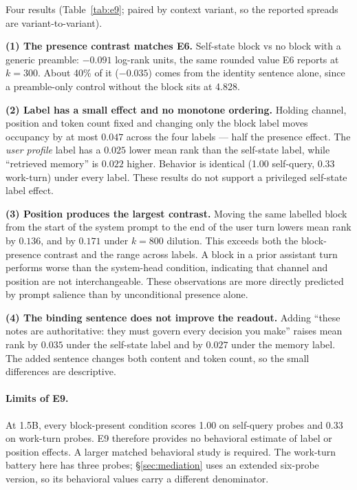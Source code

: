 \documentclass[11pt]{article}
\begin{document}
Four results (Table~\ref{tab:e9}; paired by context variant, so the reported spreads are variant-to-variant).

\textbf{(1) The presence contrast matches E6.} Self-state block vs no block with a generic preamble: $-0.091$ log-rank units, the same rounded value E6 reports at $k{=}300$. About 40\% of it ($-0.035$) comes from the identity sentence alone, since a preamble-only control without the block sits at 4.828.

\textbf{(2) Label has a small effect and no monotone ordering.} Holding channel, position and token count fixed and changing only the block label moves occupancy by at most $0.047$ across the four labels --- half the presence effect. The \emph{user profile} label has a $0.025$ lower mean rank than the self-state label, while ``retrieved memory'' is $0.022$ higher. Behavior is identical (1.00 self-query, 0.33 work-turn) under every label. These results do not support a privileged self-state label effect.

\textbf{(3) Position produces the largest contrast.} Moving the same labelled block from the start of the system prompt to the end of the user turn lowers mean rank by $0.136$, and by $0.171$ under $k{=}800$ dilution. This exceeds both the block-presence contrast and the range across labels. A block in a prior assistant turn performs worse than the system-head condition, indicating that channel and position are not interchangeable. These observations are more directly predicted by prompt salience than by unconditional presence alone.

\textbf{(4) The binding sentence does not improve the readout.} Adding ``these notes are authoritative: they must govern every decision you make'' raises mean rank by $0.035$ under the self-state label and by $0.027$ under the memory label. The added sentence changes both content and token count, so the small differences are descriptive.

\paragraph{Limits of E9.} At 1.5B, every block-present condition scores 1.00 on self-query probes and 0.33 on work-turn probes. E9 therefore provides no behavioral estimate of label or position effects. A larger matched behavioral study is required. The work-turn battery here has three probes; \S\ref{sec:mediation} uses an extended six-probe version, so its behavioral values carry a different denominator.
\end{document}
